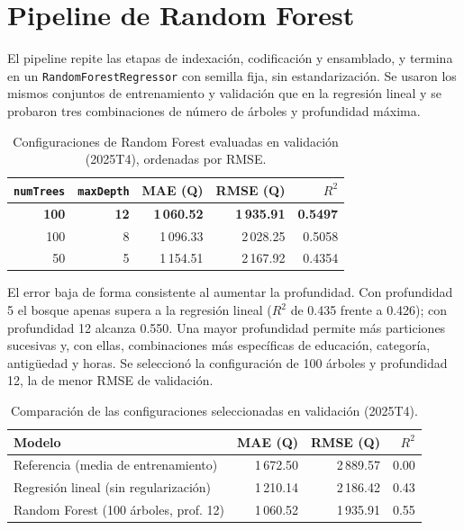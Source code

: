 \documentclass[11pt,a4paper]{article}
\newcommand{\var}[1]{\texttt{#1}}
\begin{document}
\section{Pipeline de Random Forest}

El pipeline repite las etapas de indexación, codificación y ensamblado, y termina en un \var{RandomForestRegressor} con semilla fija, sin estandarización. Se usaron los mismos conjuntos de entrenamiento y validación que en la regresión lineal y se probaron tres combinaciones de número de árboles y profundidad máxima.

\begin{table}[H]
\centering
\caption{Configuraciones de Random Forest evaluadas en validación (2025T4), ordenadas por RMSE.}
\label{tab:rf}
\small
\begin{tabular}{rrrrr}
\toprule
\var{numTrees} & \var{maxDepth} & MAE (Q) & RMSE (Q) & $R^2$ \\
\midrule
\textbf{100} & \textbf{12} & \textbf{1\,060.52} & \textbf{1\,935.91} & \textbf{0.5497} \\
100 & 8 & 1\,096.33 & 2\,028.25 & 0.5058 \\
50 & 5 & 1\,154.51 & 2\,167.92 & 0.4354 \\
\bottomrule
\end{tabular}
\end{table}

El error baja de forma consistente al aumentar la profundidad. Con profundidad 5 el bosque apenas supera a la regresión lineal ($R^2$ de 0.435 frente a 0.426); con profundidad 12 alcanza 0.550. Una mayor profundidad permite más particiones sucesivas y, con ellas, combinaciones más específicas de educación, categoría, antigüedad y horas. Se seleccionó la configuración de 100 árboles y profundidad 12, la de menor RMSE de validación.

\begin{table}[H]
\centering
\caption{Comparación de las configuraciones seleccionadas en validación (2025T4).}
\label{tab:comparacion_val}
\small
\begin{tabular}{lrrr}
\toprule
Modelo & MAE (Q) & RMSE (Q) & $R^2$ \\
\midrule
Referencia (media de entrenamiento) & 1\,672.50 & 2\,889.57 & 0.00 \\
Regresión lineal (sin regularización) & 1\,210.14 & 2\,186.42 & 0.43 \\
Random Forest (100 árboles, prof. 12) & 1\,060.52 & 1\,935.91 & 0.55 \\
\bottomrule
\end{tabular}
\end{table}
\end{document}
